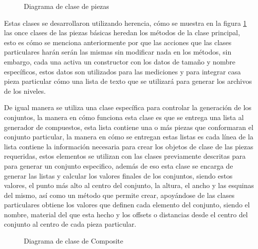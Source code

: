 \begin{figure}
  \centering
  \scalebox{.43}{}
  \caption{Diagrama de clase de piezas}
  \label{figure:pieces-class-diagram}
\end{figure}

Estas clases se desarrollaron utilizando herencia, cómo se muestra en la figura
\ref{figure:pieces-class-diagram} las once clases de las piezas básicas heredan
los métodos de la clase principal, esto es cómo se menciona anteriormente por
que las acciones que las clases particulares harán serán las mismas sin
modificar nada en los métodos, sin embargo, cada una activa un constructor con
los datos de tamaño y nombre específicos, estos datos son utilizados para las
mediciones y para integrar casa pieza particular cómo una lista de texto que se
utilizará para generar los archivos de los niveles.

De igual manera se utiliza una clase específica para controlar la generación de
los conjuntos, la manera en cómo funciona esta clase es que se entrega una lista
al generador de compuestos, esta lista contiene una o más piezas que conformaran
el conjunto particular, la manera en cómo se entregan estas listas es cada línea
de la lista contiene la información necesaria para crear los objetos de clase de
las piezas requeridas, estos elementos se utilizan con las clases previamente
descritas para para generar un conjunto especifico, además de eso esta clase se
encarga de generar las listas y calcular los valores finales de los conjuntos,
siendo estos valores, el punto más alto al centro del conjunto, la altura, el
ancho y las esquinas del mismo, así como un método que permite crear, apoyándose
de las clases particulares obtiene los valores que definen cada elemento del
conjunto, siendo el nombre, material del que esta hecho y los offsets o
distancias desde el centro del conjunto al centro de cada pieza particular.

\begin{figure}
  \centering
  \scalebox{.65}{}
  \caption{Diagrama de clase de Composite}
  \label{figure:composite-class-diagram}
\end{figure}

